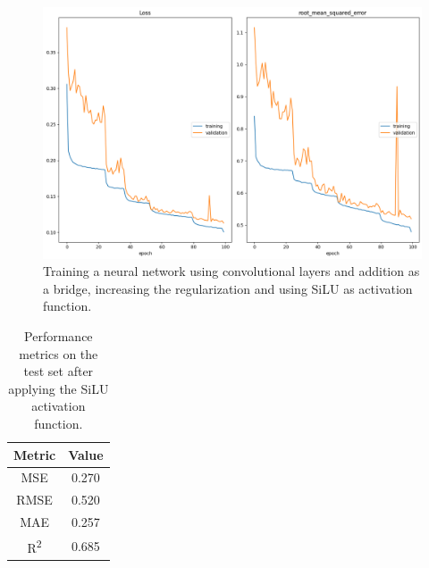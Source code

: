 \begin{figure}[H]
    \centering
    \includegraphics[width=1\textwidth]{figures/neural_net_regression_addition/train_logcosh_addition_balanced.png}
    \caption{Training a neural network using convolutional layers and addition as a bridge, increasing the regularization and using SiLU as activation function.}
    \label{fig:train_addtion_reg_balanced}
\end{figure}

\begin{table}[H]
    \centering
    \begin{tabular}{|c|c|}
    \hline
    \textbf{Metric} & \textbf{Value} \\
    \hline
    MSE & 0.270 \\
    RMSE & 0.520 \\
    MAE & 0.257 \\
    R\textsuperscript{2} & 0.685 \\
    \hline
    \end{tabular}
    \caption{Performance metrics on the test set after applying the SiLU activation function.}
    \label{tab:metrics_silu}
\end{table}

